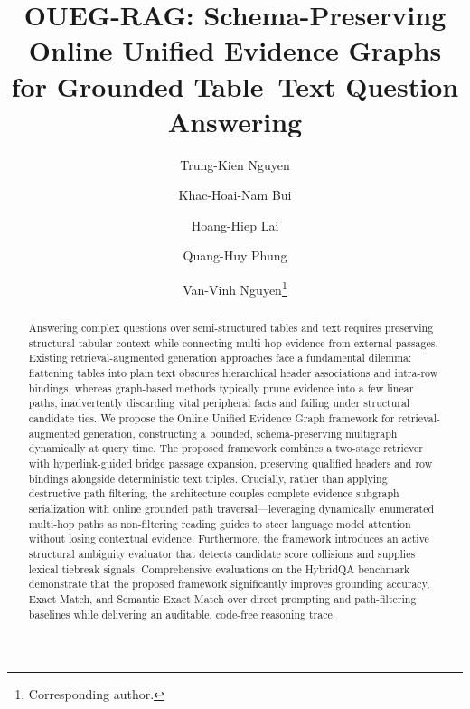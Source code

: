 \documentclass[runningheads]{llncs}
\begin{document}
\title{OUEG-RAG: Schema-Preserving Online Unified Evidence Graphs for Grounded Table--Text Question Answering}
\author{Trung-Kien Nguyen \and
Khac-Hoai-Nam Bui \and
Hoang-Hiep Lai \and
Quang-Huy Phung \and
Van-Vinh Nguyen\thanks{Corresponding author.}}
%
%
\maketitle

\begin{abstract}
Answering complex questions over semi-structured tables and text requires preserving structural tabular context while connecting multi-hop evidence from external passages. Existing retrieval-augmented generation approaches face a fundamental dilemma: flattening tables into plain text obscures hierarchical header associations and intra-row bindings, whereas graph-based methods typically prune evidence into a few linear paths, inadvertently discarding vital peripheral facts and failing under structural candidate ties. We propose the Online Unified Evidence Graph framework for retrieval-augmented generation, constructing a bounded, schema-preserving multigraph dynamically at query time. The proposed framework combines a two-stage retriever with hyperlink-guided bridge passage expansion, preserving qualified headers and row bindings alongside deterministic text triples. Crucially, rather than applying destructive path filtering, the architecture couples complete evidence subgraph serialization with online grounded path traversal---leveraging dynamically enumerated multi-hop paths as non-filtering reading guides to steer language model attention without losing contextual evidence. Furthermore, the framework introduces an active structural ambiguity evaluator that detects candidate score collisions and supplies lexical tiebreak signals. Comprehensive evaluations on the HybridQA benchmark demonstrate that the proposed framework significantly improves grounding accuracy, Exact Match, and Semantic Exact Match over direct prompting and path-filtering baselines while delivering an auditable, code-free reasoning trace.
\end{abstract}
\end{document}
